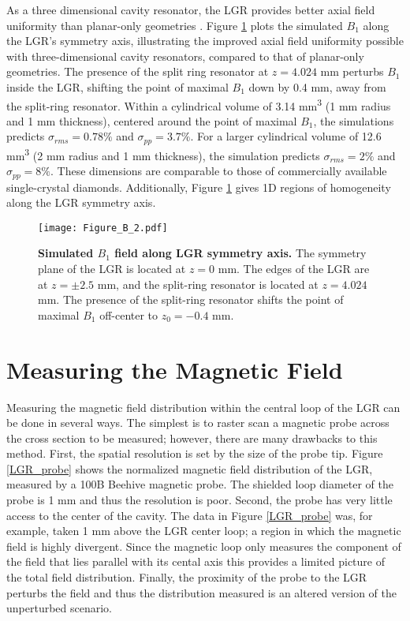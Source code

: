 As a three dimensional cavity resonator, the LGR provides better axial field uniformity than planar-only geometries \cite{floch2016towards,kapitanova2017dielectric,angerer2016collective}. Figure \ref{LGR_axial_simulated} plots the simulated $B_1$ along the LGR's symmetry axis, illustrating the improved axial field uniformity possible with three-dimensional cavity
resonators, compared to that of planar-only geometries. The presence of the split ring resonator at $z = 4.024$ mm perturbs $B_1$ inside the LGR, shifting the point of maximal $B_1$ down by 0.4 mm, away from the split-ring resonator. Within a cylindrical volume of 3.14 mm\textsuperscript{3} (1 mm radius and 1 mm thickness), centered around the point of maximal $B_1$, the simulations predicts $\sigma_{rms} = 0.78\%$ and $\sigma_{pp} = 3.7\%$. For a larger cylindrical volume of 12.6 mm\textsuperscript{3} (2 mm radius and 1 mm thickness), the simulation predicts $\sigma_{rms} = 2\%$ and $\sigma_{pp} = 8\%$. These dimensions are comparable to those of commercially available single-crystal diamonds. Additionally, Figure \ref{LGR_axial_simulated} gives 1D regions of homogeneity along the LGR symmetry axis.

\begin{figure}[t!]
\centering
\texttt{[image: Figure\_B\_2.pdf]}  
\caption{\textbf{Simulated $B_1$ field along LGR symmetry axis.} The symmetry plane of the LGR is located at $z = 0$ mm. The edges of the LGR are at $z = \pm 2.5$ mm, and the split-ring resonator is located at $z = 4.024$ mm. The presence of the split-ring resonator shifts the point of maximal $B_1$ off-center to $z_0 = -0.4$ mm.}
\label{LGR_axial_simulated}
\end{figure}

\section{Measuring the Magnetic Field} \label{field}

Measuring the magnetic field distribution within the central loop of the LGR can be done in several ways. The simplest is to raster scan a magnetic probe across the cross section to be measured; however, there are many drawbacks to this method. First, the spatial resolution is set by the size of the probe tip. Figure \ref{LGR_probe} shows the normalized magnetic field distribution of the LGR, measured by a 100B Beehive magnetic probe. The shielded loop diameter of the probe is 1 mm and thus the resolution is poor. Second, the probe has very little access to the center of the cavity. The data in Figure \ref{LGR_probe} was, for example, taken 1 mm above the LGR center loop; a region in which the magnetic field is highly divergent. Since the magnetic loop only measures the component of the field that lies parallel with its cental axis this provides a limited picture of the total field distribution. Finally, the proximity of the probe to the LGR perturbs the field and thus the distribution measured is an altered version of the unperturbed scenario. 


